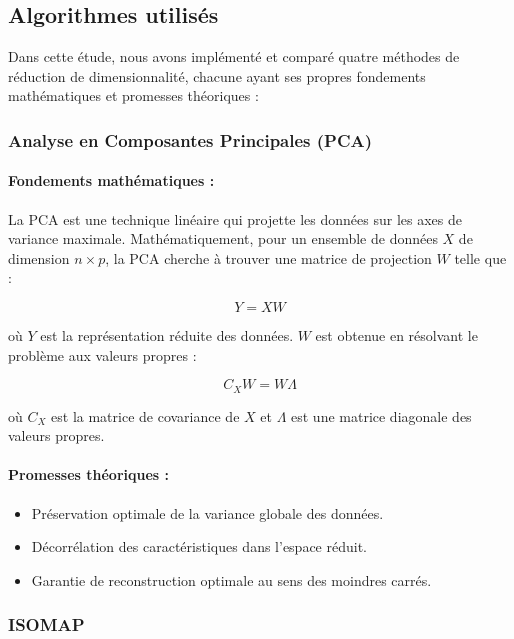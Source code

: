 \documentclass[unnumsec,webpdf,modern,large]{projet_manifold}%
\theoremstyle{thmstyleone}%
\theoremstyle{thmstyletwo}%
\theoremstyle{thmstylethree}%
\begin{document}
\subsection{Algorithmes utilisés}

Dans cette étude, nous avons implémenté et comparé quatre méthodes de réduction de dimensionnalité, chacune ayant ses propres fondements mathématiques et promesses théoriques :

\subsubsection{Analyse en Composantes Principales (PCA)}

\paragraph{Fondements mathématiques :}
La PCA est une technique linéaire qui projette les données sur les axes de variance maximale. Mathématiquement, pour un ensemble de données $X$ de dimension $n \times p$, la PCA cherche à trouver une matrice de projection $W$ telle que :

\begin{equation}
    Y = XW
\end{equation}

où $Y$ est la représentation réduite des données. $W$ est obtenue en résolvant le problème aux valeurs propres :

\begin{equation}
    C_X W = W \Lambda
\end{equation}

où $C_X$ est la matrice de covariance de $X$ et $\Lambda$ est une matrice diagonale des valeurs propres.

\paragraph{Promesses théoriques :}
\begin{itemize}
    \item Préservation optimale de la variance globale des données.
    \item Décorrélation des caractéristiques dans l'espace réduit.
    \item Garantie de reconstruction optimale au sens des moindres carrés.
\end{itemize}

\subsubsection{ISOMAP}
\end{document}
